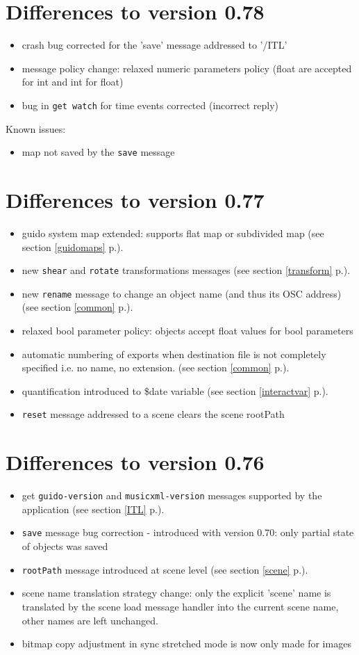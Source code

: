 \documentclass[a4paper,twoside]{report}
\newcommand{\sublevel}[1]	{\section{#1}}
\newcommand{\fullref}[1]	{\ref{#1} p.\pageref{#1}}
\newcommand{\OSC}[1]		{\texttt{#1}}
\begin{document}
\sublevel{Differences to version 0.78}
\begin{itemize}
\item crash bug corrected for the 'save' message addressed to '/ITL'
\item message policy change: relaxed numeric parameters policy (float are accepted for int and int for float)
\item bug in \OSC{get watch} for time events corrected (incorrect reply)
\end{itemize}
Known issues:
\begin{itemize}
\item map not saved by the \OSC{save} message 
\end{itemize}

\sublevel{Differences to version 0.77}
\begin{itemize}
\item guido system map extended: supports flat map or subdivided map (see section \fullref{guidomaps}).
\item new \OSC{shear} and \OSC{rotate} transformations messages (see section \fullref{transform}).
\item new \OSC{rename} message to change an object name (and thus its OSC address) (see section \fullref{common}).
\item relaxed bool parameter policy: objects accept float values for bool parameters 
\item automatic numbering of exports when destination file is not completely specified 
  i.e. no name, no extension. (see section \fullref{common}).
\item quantification introduced to \$date variable (see section \fullref{interactvar}).
\item \OSC{reset} message addressed to a scene clears the scene rootPath
\end{itemize}

\sublevel{Differences to version 0.76}
\begin{itemize}
\item  get \OSC{guido-version} and \OSC{musicxml-version} messages supported by the application (see section \fullref{ITL}).
\item  \OSC{save} message bug correction - introduced with version 0.70: only partial state of objects was saved
\item  \OSC{rootPath} message introduced at scene level (see section \fullref{scene}).
\item  scene name translation strategy change: only the explicit 'scene' name is 
  translated by the scene load message handler into the current scene name, 
  other names are left unchanged.
\item  bitmap copy adjustment in sync stretched mode is now only made for images
\end{itemize}
\end{document}
